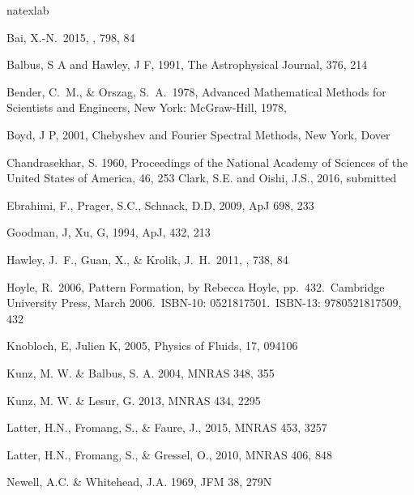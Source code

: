 \documentclass{emulateapj}
\begin{document}


\begin{thebibliography}{53}
\expandafter\ifx\csname natexlab\endcsname\relax\def\natexlab#1{#1}\fi

 Bai, X.-N.\ 2015, \apj, 798, 84 

Balbus, S A and Hawley, J F, 1991, The Astrophysical Journal, 376, 214

 Bender, C.~M., \& Orszag, S.~A.\ 1978, Advanced Mathematical Methods for Scientists and Engineers, New York: McGraw-Hill, 1978,

Boyd, J P, 2001, Chebyshev and Fourier Spectral Methods, New York, Dover

Chandrasekhar, S. 1960, Proceedings of the National Academy of Sciences of the United States of America, 46, 253
Clark, S.E. and Oishi, J.S., 2016, submitted

Ebrahimi, F., Prager, S.C., Schnack, D.D, 2009, ApJ 698, 233

Goodman, J, Xu, G, 1994, ApJ, 432, 213

 Hawley, J.~F., Guan, X., \& Krolik, J.~H.\ 2011, \apj, 738, 84 

 Hoyle, R.\ 2006, Pattern
  Formation, by Rebecca Hoyle, pp.~432.~Cambridge University Press,
  March 2006.~ISBN-10: 0521817501.~ISBN-13: 9780521817509, 432

Knobloch, E, Julien K, 2005, Physics of Fluids, 17, 094106

Kunz, M. W. \& Balbus, S. A. 2004, MNRAS 348, 355

Kunz, M. W. \& Lesur, G. 2013, MNRAS 434, 2295

Latter, H.N., Fromang, S., \& Faure, J., 2015, MNRAS 453, 3257

Latter, H.N., Fromang, S., \& Gressel, O., 2010, MNRAS 406, 848

Newell, A.C. \& Whitehead, J.A. 1969, JFM 38, 279N


\end{thebibliography}
\end{document}
